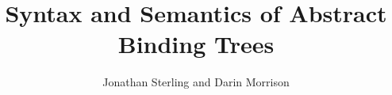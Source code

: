 \documentclass[11pt]{article}
\theoremstyle{definition}
\theoremstyle{remark}
\numberwithin{equation}{section}
\begin{document}
\title{Syntax and Semantics of Abstract Binding Trees}
\date{}
\author{Jonathan Sterling and Darin Morrison}
\maketitle



\newpage
\appendix
\appendixpage



\ifdraft{}{
  \newpage
  
  
}
\end{document}
